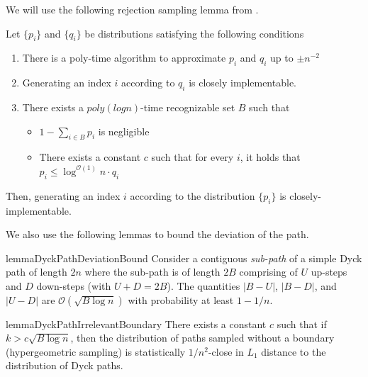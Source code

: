 We will use the following rejection sampling lemma from \cite{huge}.
\begin{lemma}
\label{lem:huge}
Let $\{p_i\}$ and $\{q_i\}$ be distributions satisfying the following conditions
\begin{enumerate}
    \item There is a poly-time algorithm to approximate $p_i$ and $q_i$ up to $\pm n^{-2}$
    \item Generating an index $i$ according to $q_i$ is closely implementable.
    \item There exists a $poly(log n)$-time recognizable set $B$ such that
    \begin{itemize}
        \item $1-\sum\limits_{i\in B} p_i$ is negligible
        \item There exists a constant $c$ such that for every $i$, it holds that $p_i\le \log^{\mathcal{O}(1)} n\cdot q_i$
    \end{itemize}
\end{enumerate}
Then, generating an index $i$ according to the distribution $\{p_i\}$ is closely-implementable.
\end{lemma}

We also use the following lemmas to bound the deviation of the path.
\begin{restatable}{lemma}{DyckPathDeviationBound}
\label{lem:dyck_path_deviation_bound}
Consider a contiguous \emph{sub-path} of a simple Dyck path of length $2n$
where the sub-path is of length $2B$ comprising of $U$ up-steps and $D$ down-steps (with $U + D = 2B$).
The quantities $|B-U|$, $|B-D|$, and $|U-D|$ are $\mathcal O(\sqrt{B\log n})$ with probability at least $1-1/n$.
\end{restatable}
\begin{restatable}{lemma}{DyckPathIrrelevantBoundary}
\label{lem:dyck_path_irrelevant_boundary}
There exists a constant $c$ such that if $k > c \sqrt{B\log n}$, then the distribution of paths sampled without a boundary
(hypergeometric sampling) is statistically $1/n^2$-close in $L_1$ distance to the distribution of Dyck paths.
\end{restatable}


